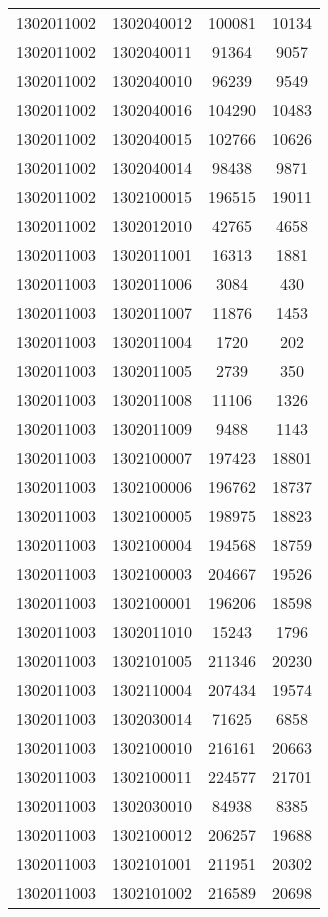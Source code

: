 \begin{longtable}[h]{llcc}
		1302011002 & 1302040012 & 100081 & 10134\\
		1302011002 & 1302040011 & 91364 & 9057\\
		1302011002 & 1302040010 & 96239 & 9549\\
		1302011002 & 1302040016 & 104290 & 10483\\
		1302011002 & 1302040015 & 102766 & 10626\\
		1302011002 & 1302040014 & 98438 & 9871\\
		1302011002 & 1302100015 & 196515 & 19011\\
		1302011002 & 1302012010 & 42765 & 4658\\
		1302011003 & 1302011001 & 16313 & 1881\\
		1302011003 & 1302011006 & 3084 & 430\\
		1302011003 & 1302011007 & 11876 & 1453\\
		1302011003 & 1302011004 & 1720 & 202\\
		1302011003 & 1302011005 & 2739 & 350\\
		1302011003 & 1302011008 & 11106 & 1326\\
		1302011003 & 1302011009 & 9488 & 1143\\
		1302011003 & 1302100007 & 197423 & 18801\\
		1302011003 & 1302100006 & 196762 & 18737\\
		1302011003 & 1302100005 & 198975 & 18823\\
		1302011003 & 1302100004 & 194568 & 18759\\
		1302011003 & 1302100003 & 204667 & 19526\\
		1302011003 & 1302100001 & 196206 & 18598\\
		1302011003 & 1302011010 & 15243 & 1796\\
		1302011003 & 1302101005 & 211346 & 20230\\
		1302011003 & 1302110004 & 207434 & 19574\\
		1302011003 & 1302030014 & 71625 & 6858\\
		1302011003 & 1302100010 & 216161 & 20663\\
		1302011003 & 1302100011 & 224577 & 21701\\
		1302011003 & 1302030010 & 84938 & 8385\\
		1302011003 & 1302100012 & 206257 & 19688\\
		1302011003 & 1302101001 & 211951 & 20302\\
		1302011003 & 1302101002 & 216589 & 20698\\

\end{longtable}
